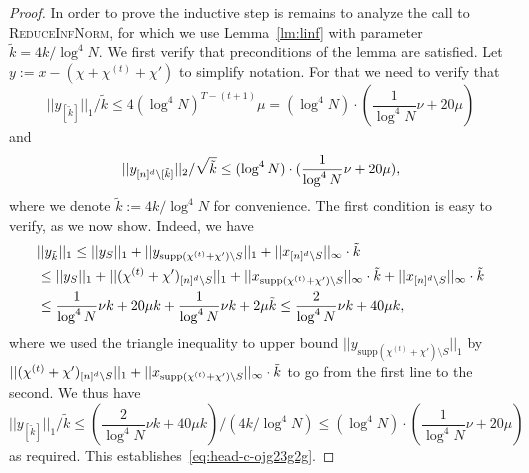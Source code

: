 \begin{proof}
In order to prove the inductive step is remains to analyze the call to \textsc{ReduceInfNorm}, for which we use Lemma~\ref{lm:linf} with parameter $\tilde k=4k/\log^4 N$. We first verify that preconditions of the lemma are satisfied. Let $y:=x-(\chi+\chi^{(t)}+\chi')$ to simplify notation. For that we need to verify that 
\begin{equation}\label{eq:head-c-ojg23g2g}
||y_{[\tilde k]}||_1/\tilde k\leq 4(\log^4 N)^{T-(t+1)}\mu=(\log^4 N)\cdot (\frac1{\log^4 N}\nu+20 \mu)
\end{equation}
and 
\begin{equation}\label{eq:pih2gg3rg}
||y_{{[n]^d}\setminus [\tilde k]}||_2/\sqrt{\tilde k}\leq (\log^4 N)\cdot (\frac1{\log^4 N}\nu +20\mu ),
\end{equation}
where we denote $\tilde k:=4k/\log^4 N$ for convenience. The first condition is easy to verify, as we now show. Indeed, we have
\begin{equation*}
\begin{split}
&||y_{\tilde k}||_1\leq ||y_S||_1+||y_{\text{supp}(\chi^{(t)}+\chi')\setminus S}||_1+||x_{{[n]^d}\setminus S}||_\infty \cdot \tilde k\\
&\leq ||y_S||_1 + ||(\chi^{(t)}+\chi')_{{[n]^d}\setminus S}||_1+||x_{\text{supp}(\chi^{(t)}+\chi')\setminus S}||_\infty\cdot \tilde k+||x_{{[n]^d}\setminus S}||_\infty\cdot \tilde k\\
&\leq \frac1{\log^4 N}\nu k+20\mu k + \frac1{\log^4 N}\nu k+2\mu \tilde k\leq \frac2{\log^4 N}\nu k+40 \mu k,
\end{split}
\end{equation*}
where we used the triangle inequality to upper bound $||y_{\text{supp}(\chi^{(t)}+\chi')\setminus S}||_1$ by $||(\chi^{(t)}+\chi')_{{[n]^d}\setminus S}||_1+||x_{\text{supp}(\chi^{(t)}+\chi')\setminus S}||_\infty\cdot \tilde k$ to go from the first line to the second. We thus have 
$$
||y_{[\tilde k]}||_1/\tilde k\leq (\frac2{\log^4 N}\nu k+40 \mu k)/(4k/\log^4 N)\leq (\log^4 N)\cdot (\frac1{\log^4 N}\nu+20 \mu)
$$ 
as required. This establishes~\eqref{eq:head-c-ojg23g2g}.


\end{proof}
